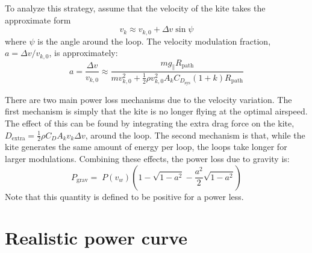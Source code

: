 \documentclass[11pt]{amsart}
\newcommand{\extra}{\mathrm{extra}}
\newcommand{\grav}{\mathrm{grav}}
\newcommand{\kite}{k}
\newcommand{\path}{\mathrm{path}}
\newcommand{\sys}{\mathrm{sys}}
\newcommand{\wind}{w}
\begin{document}
To analyze this strategy, assume that the velocity of the kite takes
the approximate form
%
\begin{equation}
  v_{\kite} \approx v_{\kite,0} + \Delta v \sin \psi
\end{equation}
%
where $\psi$ is the angle around the loop.  The velocity modulation
fraction, $a = \Delta v / v_{\kite,0}$, is approximately:
%
\begin{equation}
  \label{eqn:velocity_modulation}
  a = \frac{\Delta v}{v_{\kite,0}} \approx
      \frac{m g_{\parallel} R_{\path}}
           {m v_{\kite, 0}^2 +
            \frac{1}{2} \rho v_{\kite, 0}^2 A_{\kite} C_{D_{\sys}} (1 + k) R_{\path}}
\end{equation}
%

There are two main power loss mechanisms due to the velocity
variation.  The first mechanism is simply that the kite is no longer
flying at the optimal airspeed.  The effect of this can be found by
integrating the extra drag force on the kite,
$D_{\extra} = \frac{1}{2} \rho C_D A_{\kite} v_{\kite} \Delta v$, around
the loop.  The second mechanism is that, while the kite generates the
same amount of energy per loop, the loops take longer for larger
modulations.  Combining these effects, the power loss due to gravity
is:
%
\begin{equation}
  \label{eqn:gravity_loss2}
  P_{\grav} = \; P(v_{\wind}) \left( 1 - \sqrt{1 - a^2} - \frac{a^2}{2} \sqrt{1 - a^2} \right)
\end{equation}
%
Note that this quantity is defined to be positive for a power less.

\section{Realistic power curve}
\end{document}
